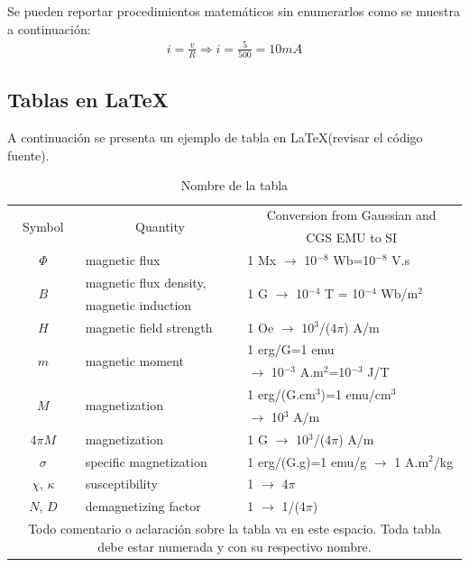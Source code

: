 \documentclass[journal]{IEEEtran}
\begin{document}
Se pueden reportar procedimientos matemáticos sin enumerarlos como se muestra a continuación:
\begin{gather*}
i=\frac{v}{R}\Longrightarrow i=\frac{5}{500}=10 mA
\end{gather*}

\subsection{Tablas en \LaTeX}
A continuación se presenta un ejemplo de tabla en \LaTeX (revisar el código fuente).

\begin{table}[H]
\makegapedcells
\centering
\caption{Nombre de la tabla}
\begin{tabular}{c l l}\hline\hline
\multirow{2}{*}{Symbol} & \multicolumn{1}{c}{\multirow{2}{*}{Quantity}} & \multicolumn{1}{c}{Conversion from Gaussian and}\\ 
& & \multicolumn{1}{c}{CGS EMU to SI}\\ \hline
$\Phi$ & magnetic flux & 1 Mx $\rightarrow$ 10$^{-8}$ Wb=10$^{-8}$ V.s \\
\multirow{2}{*}{$B$} & magnetic flux density, & \multirow{2}{*}{1 G $\rightarrow$ 10$^{-4}$ T = 10$^{-4}$ Wb/m$^2$}\\
& magnetic induction & \\
$H$ & magnetic field strength & 1 Oe $\rightarrow$ 10$^3$/(4$\pi$) A/m\\
\multirow{2}{*}{$m$} & \multirow{2}{*}{magnetic moment} & 1 erg/G=1 emu \\ 
& & $\rightarrow$ 10$^{-3}$ A.m$^2$=10$^{-3}$ J/T\\
\multirow{2}{*}{$M$} & \multirow{2}{*}{magnetization} & 1 erg/(G.cm$^3$)=1 emu/cm$^3$ \\ 
& & $\rightarrow$ 10$^3$ A/m\\ 
4$\pi M$& magnetization & 1 G $\rightarrow$ 10$^3$/(4$\pi$) A/m \\ 
$\sigma$ & specific magnetization & 1 erg/(G.g)=1 emu/g $\rightarrow$ 1 A.m$^2$/kg\\ 
$\chi$, $\kappa$ & susceptibility & 1 $\rightarrow$ 4$\pi$ \\ 
$N$, $D$ & demagnetizing factor & 1 $\rightarrow$ 1/(4$\pi$)\\ \hline\hline
\multicolumn{3}{p{8.5cm}}{Todo comentario o aclaración sobre la tabla va en este espacio. Toda tabla debe estar numerada y con su respectivo nombre.}\\
\end{tabular}
\label{table1}
\end{table}
\end{document}
